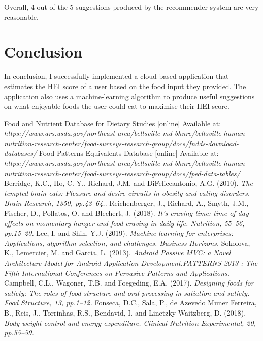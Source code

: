 \documentclass{article}
\begin{document}
\bigskip
\noindent Overall, 4 out of the 5 suggestions produced by the recommender system are very reasonable. 

\section{Conclusion}
In conclusion, I successfully implemented a cloud-based application that estimates the HEI score of a user based on the food input they provided. The application also uses a machine-learning algorithm to produce useful suggestions on what enjoyable foods the user could eat to maximise their HEI score. 

\newpage
\begin{thebibliography}{9}
Food and Nutrient Database for Dietary Studies [online] Available at: \textit{https://www.ars.usda.gov/northeast-area/beltsville-md-bhnrc/beltsville-human-nutrition-research-center/food-surveys-research-group/docs/fndds-download-databases/}
Food Patterns Equivalents Database [online] Available at: 
\textit{https://www.ars.usda.gov/northeast-area/beltsville-md-bhnrc/beltsville-human-nutrition-research-center/food-surveys-research-group/docs/fped-data-tables/}
Berridge, K.C., Ho, C.-Y., Richard, J.M. and DiFeliceantonio, A.G. (2010). 
\textit{The tempted brain eats: Pleasure and desire circuits in obesity and eating disorders. Brain Research, 1350, pp.43–64.}. 
Reichenberger, J., Richard, A., Smyth, J.M., Fischer, D., Pollatos, O. and Blechert, J. (2018).
\textit{It’s craving time: time of day effects on momentary hunger and food craving in daily life. Nutrition, 55–56, pp.15–20.}
Lee, I. and Shin, Y.J. (2019). \textit{Machine learning for enterprises: Applications, algorithm selection, and challenges. Business Horizons.}
Sokolova, K., Lemercier, M. and Garcia, L. (2013). \textit{Android Passive MVC: a Novel Architecture Model  for Android Application Development.PATTERNS 2013 : The Fifth International Conferences on Pervasive Patterns and Applications.}
Campbell, C.L., Wagoner, T.B. and Foegeding, E.A. (2017). \textit{Designing foods for satiety: The roles of food structure and oral processing in satiation and satiety. Food Structure, 13, pp.1–12.}
Fonseca, D.C., Sala, P., de Azevedo Muner Ferreira, B., Reis, J., Torrinhas, R.S., Bendavid, I. and Linetzky Waitzberg, D. (2018). \textit{Body weight control and energy expenditure. Clinical Nutrition Experimental, 20, pp.55–59.}

\end{thebibliography}
\end{document}
